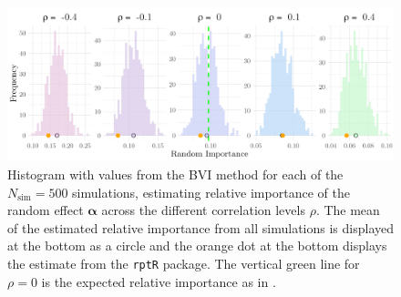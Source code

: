 \begin{figure}[H]
  \centering
    \includegraphics[width=1\linewidth]{Figures/Simulation study/Random_logit.png}
    \caption[Relative importance of the random effect $\boldsymbol{\alpha}$ in Binomial GLMM]{Histogram with values from the BVI method for each of the $N_{\text{sim}}=500$ simulations, estimating relative importance of the random effect $\boldsymbol{\alpha}$ across the different correlation levels $\rho$. The mean of the estimated relative importance from all simulations is displayed at the bottom as a circle and the orange dot at the bottom displays the estimate from the \texttt{rptR} package. The vertical green line for $\rho=0$ is the expected relative importance as in .}
    \label{fig:relimp_random_logit}
\end{figure}
